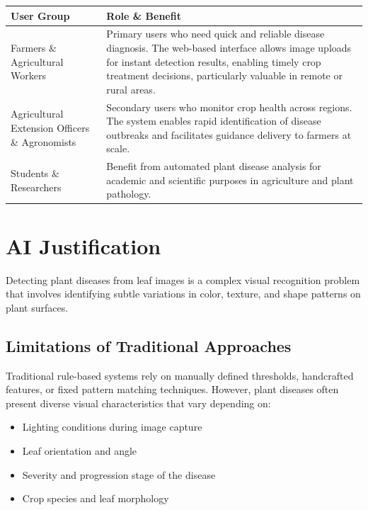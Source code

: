 \documentclass[12pt,a4paper]{article}
\begin{document}
\vspace{8pt}
\begin{tabularx}{\textwidth}{>{\raggedright\arraybackslash}p{4.2cm} >{\raggedright\arraybackslash}X}
  \toprule
  \rowcolor{primarynavy}
  \color{white}\textbf{User Group} & \color{white}\textbf{Role \& Benefit} \\
  \midrule
  Farmers \& Agricultural Workers &
  Primary users who need quick and reliable disease diagnosis. The web-based interface allows image uploads for instant detection results, enabling timely crop treatment decisions, particularly valuable in remote or rural areas. \\
  \rowcolor{iceblue}
  Agricultural Extension Officers \& Agronomists &
  Secondary users who monitor crop health across regions. The system enables rapid identification of disease outbreaks and facilitates guidance delivery to farmers at scale. \\
  Students \& Researchers &
  Benefit from automated plant disease analysis for academic and scientific purposes in agriculture and plant pathology. \\
  \bottomrule
\end{tabularx}

\section{AI Justification}

Detecting plant diseases from leaf images is a complex visual recognition problem that involves identifying subtle variations in color, texture, and shape patterns on plant surfaces.

\subsection{Limitations of Traditional Approaches}

Traditional rule-based systems rely on manually defined thresholds, handcrafted features, or fixed pattern matching techniques. However, plant diseases often present diverse visual characteristics that vary depending on:

\begin{itemize}[leftmargin=*, itemsep=5pt]
  \item Lighting conditions during image capture
  \item Leaf orientation and angle
  \item Severity and progression stage of the disease
  \item Crop species and leaf morphology
\end{itemize}
\end{document}
